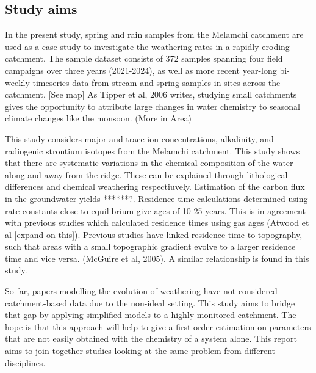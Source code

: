 \subsection{Study aims}


In the present study, spring and rain samples from the Melamchi catchment are used as a case 
study to investigate the weathering rates in a rapidly eroding catchment. The sample dataset consists of 372 samples spanning four field campaigns over three years (2021-2024), as well as more recent year-long bi-weekly timeseries data from stream and spring samples in sites across the catchment. [See map] 
As Tipper et al, 2006 writes, studying small catchments gives the opportunity to attribute large changes in water chemistry to seasonal climate changes like the monsoon. (More in Area)


 
\bsk

This study considers major and trace ion concentrations, alkalinity, and radiogenic strontium isotopes from the Melamchi catchment. This study shows that there are systematic variations in the chemical composition of the water along and away from the ridge. These can be explained through lithological differences and chemical weathering respectiuvely. Estimation of the carbon flux in the groundwater yields ******?. Residence time calculations determined using rate constants close to equilibrium give ages of 10-25 years. This is in agreement with previous studies which calculated residence times using gas ages (Atwood et al [expand on this]). Previous studies have linked residence time to topography, such that areas with a small topographic gradient evolve to a larger residence time and vice versa. (McGuire et al, 2005). A similar relationship is found in this study.

 
\bsk

So far, papers modelling the evolution of weathering have not considered catchment-based data due to the non-ideal setting. This study aims to bridge that gap by applying simplified models to a highly monitored catchment. The hope is that this approach will help to give a first-order estimation on parameters that are not easily obtained with the chemistry of a system alone. This report aims to join together studies looking at the same problem from different disciplines.





